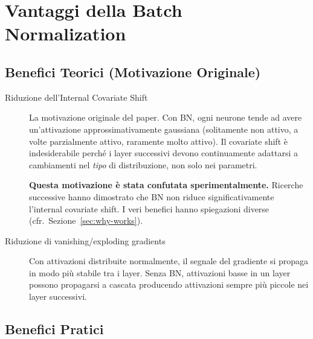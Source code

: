 \section{Vantaggi della Batch Normalization}
\label{sec:bn-benefits}

\subsection{Benefici Teorici (Motivazione Originale)}
\label{subsec:bn-theory}

\begin{description}
  \item[Riduzione dell'Internal Covariate Shift] La motivazione originale
        del paper. Con BN, ogni neurone tende ad avere un'attivazione
        approssimativamente gaussiana (solitamente non attivo, a volte
        parzialmente attivo, raramente molto attivo). Il covariate shift è
        indesiderabile perché i layer successivi devono continuamente
        adattarsi a cambiamenti nel \emph{tipo} di distribuzione, non solo
        nei parametri.

        \begin{tcolorbox}[colback=orange!5!white, colframe=orange!60!black,
                          title={Nota critica}]
          \textbf{Questa motivazione è stata confutata sperimentalmente.}
          Ricerche successive hanno dimostrato che BN non riduce
          significativamente l'internal covariate shift. I veri benefici
          hanno spiegazioni diverse (cfr.\ Sezione~\ref{sec:why-works}).
        \end{tcolorbox}

  \item[Riduzione di vanishing/exploding gradients] Con attivazioni
        distribuite normalmente, il segnale del gradiente si propaga in modo
        più stabile tra i layer. Senza BN, attivazioni basse in un layer
        possono propagarsi a cascata producendo attivazioni sempre più piccole
        nei layer successivi.
\end{description}

\subsection{Benefici Pratici}
\label{subsec:bn-practical}

